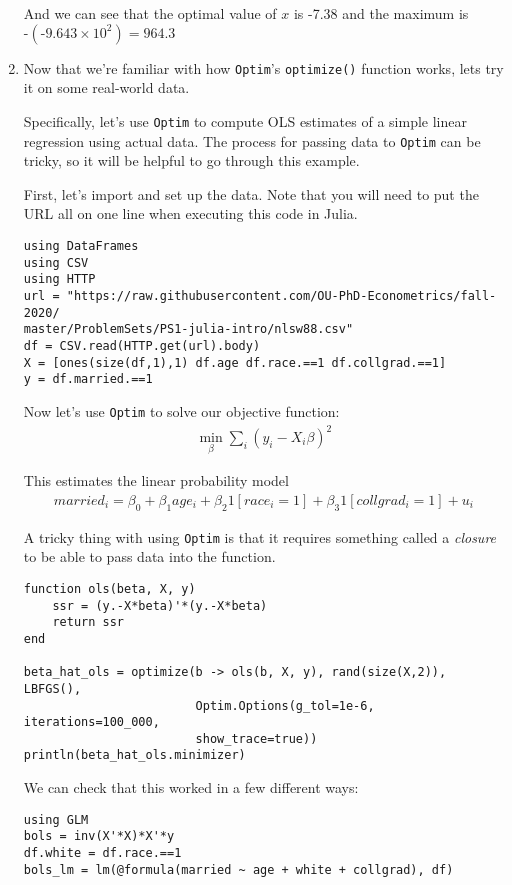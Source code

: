 \documentclass[12pt,english]{article}
\begin{document}
\begin{enumerate}
And we can see that the optimal value of $x$ is -7.38 and the maximum is $\text{-}\left(\text{-}9.643\times 10^2\right)=964.3$

\item Now that we're familiar with how \texttt{Optim}'s \texttt{optimize()} function works, lets try it on some real-world data. 

Specifically, let's use \texttt{Optim} to compute OLS estimates of a simple linear regression using actual data. The process for passing data to \texttt{Optim} can be tricky, so it will be helpful to go through this example.

First, let's import and set up the data. Note that you will need to put the URL all on one line when executing this code in Julia.

\begin{verbatim}
using DataFrames
using CSV
using HTTP
url = "https://raw.githubusercontent.com/OU-PhD-Econometrics/fall-2020/
master/ProblemSets/PS1-julia-intro/nlsw88.csv"
df = CSV.read(HTTP.get(url).body)
X = [ones(size(df,1),1) df.age df.race.==1 df.collgrad.==1]
y = df.married.==1
\end{verbatim}

Now let's use \texttt{Optim} to solve our objective function:
\begin{align*}
    \min_\beta \sum_i\left(y_i - 
    X_i\beta\right)^2
\end{align*}

This estimates the linear probability model
\begin{align*}
    married_i = \beta_0 + \beta_1 age_i + \beta_2 1[race_i=1] + \beta_3 1[collgrad_i=1] + u_i
\end{align*}

A tricky thing with using \texttt{Optim} is that it requires something called a \textit{closure} to be able to pass data into the function.

\begin{verbatim}
function ols(beta, X, y)
    ssr = (y.-X*beta)'*(y.-X*beta)
    return ssr
end

beta_hat_ols = optimize(b -> ols(b, X, y), rand(size(X,2)), LBFGS(), 
                        Optim.Options(g_tol=1e-6, iterations=100_000, 
                        show_trace=true))
println(beta_hat_ols.minimizer)
\end{verbatim}

We can check that this worked in a few different ways:

\begin{verbatim}
using GLM
bols = inv(X'*X)*X'*y
df.white = df.race.==1
bols_lm = lm(@formula(married ~ age + white + collgrad), df)
\end{verbatim}


\end{enumerate}
\end{document}
